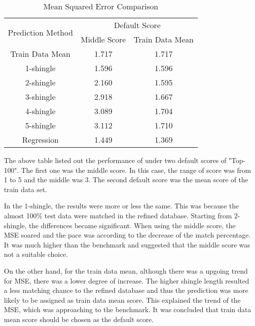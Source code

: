 \begin{table}[H]
\caption{Mean Squared Error Comparison}
		\begin{tabular}{ccc}
			\toprule
				\multirow{2}{*}{Prediction Method} &
				\multicolumn{2}{c}{Default Score}\\
				\cline{2-3}
				& Middle Score & Train Data Mean \\
			\midrule
				Train Data Mean & 1.717 & 1.717 \\
				\hline
				1-shingle & 1.596 & 1.596\\
				2-shingle & 2.160 & 1.595\\
				3-shingle & 2.918 & 1.667\\
				4-shingle & 3.089 & 1.704\\
				5-shingle & 3.112 & 1.710\\
				\hline
				Regression & 1.449 & 1.369\\
				
			\bottomrule
		\end{tabular}

\end{table}

The above table listed out the performance of under two default scores of "Top-100". The first one was the middle score. In this case, the range of score was from 1 to 5 and the middle was 3. The second default score was the mean score of the train data set.

In the 1-shingle, the results were more or less the same. This was because the almost 100\% test data were matched in the refined database. 
Starting from 2-shingle, the differences became significant. When using the middle score, the MSE soared and the pace was according to the decrease of the match percentage. It was much higher than the benchmark and suggested that the middle score was not a suitable choice.

On the other hand, for the train data mean, although there was a upgoing trend for MSE, there was a lower degree of increase.
The higher shingle length resulted a less matching chance to the refined database and thus the prediction was more likely to be assigned as train data mean score. This explained the trend of the MSE, which was approaching to the benchmark.
It was concluded that train data mean score should be chosen as the default score.


%
%


